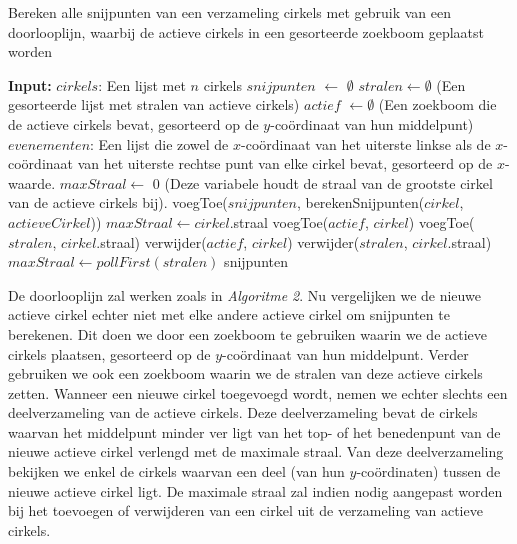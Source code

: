\documentclass[11pt,a4paper]{report}
\begin{document}
\begin{algorithm}
\caption{Bereken alle snijpunten van een verzameling cirkels met gebruik van een doorlooplijn, waarbij de actieve cirkels in een gesorteerde zoekboom geplaatst worden}
\begin{algorithmic}
	\STATE \textbf{Input:} $cirkels$: Een lijst met $n$ cirkels
	\STATE $snijpunten$ $\gets$ $\emptyset$
	\STATE $stralen \gets \emptyset$ (Een gesorteerde lijst met stralen van actieve cirkels)
	\STATE $actief$ $\gets \emptyset$ (Een zoekboom die de  actieve cirkels bevat, gesorteerd op de $y$-co\"ordinaat van hun middelpunt)
	\STATE $evenementen$: Een lijst die zowel de $x$-co\"ordinaat van het uiterste linkse als de $x$-co\"ordinaat van het uiterste rechtse punt van elke cirkel bevat, gesorteerd op de $x$-waarde.
	\STATE $maxStraal \gets$ 0 (Deze variabele houdt de straal van de grootste cirkel van de actieve cirkels bij).
         \STATE voegToe($snijpunten$, berekenSnijpunten($cirkel$, $actieveCirkel$))
          \ENDIF
          \ENDFOR
        	\STATE $maxStraal \gets cirkel$.straal
        \ENDIF
         \STATE voegToe($actief$, $cirkel$)
         \STATE voegToe($stralen$, $cirkel$.straal)
         \STATE verwijder($actief$, $cirkel$)
         \STATE verwijder($stralen$, $cirkel$.straal)
         	\STATE $maxStraal \gets pollFirst(stralen)$
        \ENDIF
        \ENDIF
    \ENDFOR
    \RETURN snijpunten
\end{algorithmic}
\end{algorithm}

De doorlooplijn zal werken zoals in \emph{Algoritme 2}. Nu vergelijken we de nieuwe actieve cirkel echter niet met elke andere actieve cirkel om snijpunten te berekenen. Dit doen we door een zoekboom te gebruiken waarin we de actieve cirkels plaatsen, gesorteerd op de $y$-co\"ordinaat van hun middelpunt. Verder gebruiken we ook een zoekboom waarin we de stralen van deze actieve cirkels zetten. Wanneer een nieuwe cirkel toegevoegd wordt, nemen we echter slechts een deelverzameling van de actieve cirkels. Deze deelverzameling bevat de cirkels waarvan het middelpunt minder ver ligt van het top- of het benedenpunt van de nieuwe actieve cirkel verlengd met de maximale straal. Van deze deelverzameling bekijken we enkel de cirkels waarvan een deel (van hun $y$-co\"ordinaten) tussen de nieuwe actieve cirkel ligt. De maximale straal zal indien nodig aangepast worden bij het toevoegen of verwijderen van een cirkel uit de verzameling van actieve cirkels.
\end{document}
